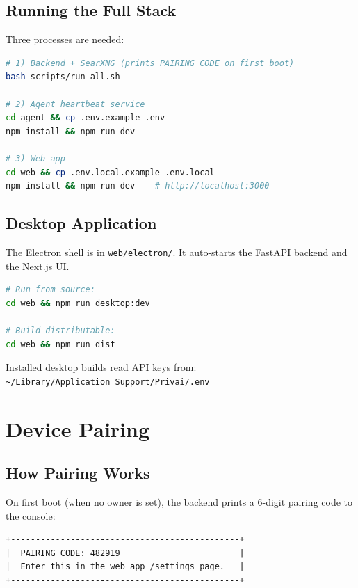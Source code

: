 \documentclass[a4paper,11pt,twoside]{report}
\begin{document}
\section{Running the Full Stack}
Three processes are needed:

\begin{lstlisting}[language=bash]
# 1) Backend + SearXNG (prints PAIRING CODE on first boot)
bash scripts/run_all.sh

# 2) Agent heartbeat service
cd agent && cp .env.example .env
npm install && npm run dev

# 3) Web app
cd web && cp .env.local.example .env.local
npm install && npm run dev    # http://localhost:3000
\end{lstlisting}

\section{Desktop Application}
The Electron shell is in \texttt{web/electron/}. It auto-starts the FastAPI backend and the Next.js UI.

\begin{lstlisting}[language=bash]
# Run from source:
cd web && npm run desktop:dev

# Build distributable:
cd web && npm run dist
\end{lstlisting}

Installed desktop builds read API keys from:\\
\texttt{\textasciitilde/Library/Application Support/Privai/.env}

\chapter{Device Pairing}

\section{How Pairing Works}
On first boot (when no owner is set), the backend prints a 6-digit pairing code to the console:

\begin{lstlisting}
+----------------------------------------------+
|  PAIRING CODE: 482919                        |
|  Enter this in the web app /settings page.   |
+----------------------------------------------+
\end{lstlisting}
\end{document}
